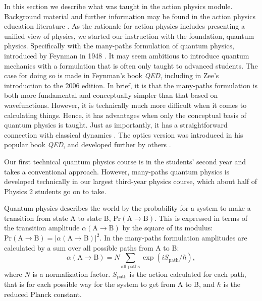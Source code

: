 \documentclass[prb,oncolumn,12pt]{revtex4-2}
\begin{document}
In this section we describe what was taught in the action physics module. Background material and further information may be found in the action physics education literature  \cite{TaylorCIP, Hanc2003, Moore, HancAJP2004a, HancAJP2004b, Ogborn, Neuenschwander}. As the rationale for action physics includes presenting a unified view of physics, we started our instruction with the foundation, quantum physics. Specifically with the many-paths formulation of quantum physics, introduced by Feynman in 1948  \cite{FeynmanRMP, FeynmanHibbs}. It may seem ambitious to introduce quantum mechanics with a formulation that is often only taught to advanced students. The case for doing so is made in Feynman's book \textit{QED}, including in Zee's introduction to the 2006 edition. \cite{QED} In brief, it is that the many-paths formulation is both more fundamental and conceptually simpler than that based on wavefunctions. However, it is technically much more difficult when it comes to calculating things. Hence, it has advantages when only the conceptual basis of quantum physics is taught. Just as importantly, it has a straightforward connection with classical dynamics  \cite{TaylorCIP, Ogborn, Dirac}. The optics version was introduced in his popular book \textit{QED},  \cite{QED} and developed further by others  \cite{deGrooth,Field}.

Our first technical quantum physics course is in the students' second year and takes a conventional approach. \cite{Griffiths} However, many-paths quantum physics is developed technically in our largest third-year physics course, which about half of Physics 2 students go on to take.

Quantum physics describes the world by the probability for a system to make a transition from state A to state B, $\textrm{Pr} ( \textrm{A} \rightarrow \textrm{B} )$. This is expressed in terms of the transition amplitude $\alpha ( \textrm{A} \rightarrow \textrm{B} )$ by the square of its modulus: $\textrm{Pr} ( \textrm{A} \rightarrow \textrm{B} ) = | \alpha ( \textrm{A} \rightarrow \textrm{B} ) |^2$. In the many-paths formulation amplitudes are calculated by a sum over all possible paths from A to B: 
%
\begin{equation} \label{amplitude}
\alpha ( \textrm{A} \rightarrow \textrm{B} ) = N \sum_\textrm{all paths} \exp ( i S_\textrm{path} / \hbar ) ,
\end{equation}
%
where $N$ is a normalization factor. $S_\textrm{path}$ is the action calculated for each path, that is for each possible way for the system to get from A to B, and $\hbar$ is the reduced Planck constant. 
\end{document}
